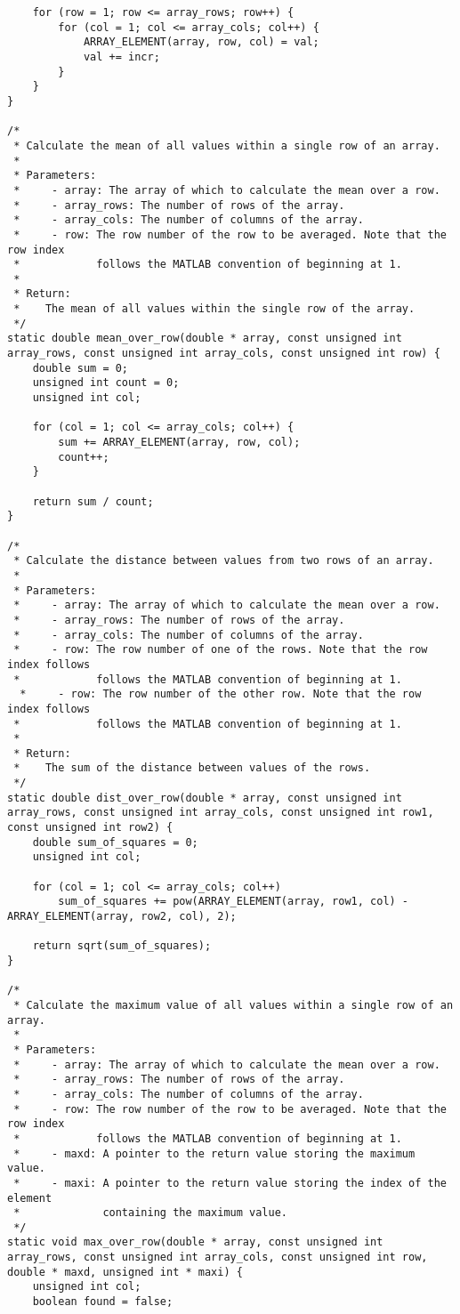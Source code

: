 \begin{lstlisting}
    for (row = 1; row <= array_rows; row++) {
        for (col = 1; col <= array_cols; col++) {
            ARRAY_ELEMENT(array, row, col) = val;
            val += incr;
        }
    }
}

/*
 * Calculate the mean of all values within a single row of an array.
 *
 * Parameters:
 *     - array: The array of which to calculate the mean over a row.
 *     - array_rows: The number of rows of the array.
 *     - array_cols: The number of columns of the array.
 *     - row: The row number of the row to be averaged. Note that the row index 
 *            follows the MATLAB convention of beginning at 1.
 *
 * Return:
 *    The mean of all values within the single row of the array.
 */
static double mean_over_row(double * array, const unsigned int array_rows, const unsigned int array_cols, const unsigned int row) {
    double sum = 0;
    unsigned int count = 0;
    unsigned int col;

    for (col = 1; col <= array_cols; col++) {
        sum += ARRAY_ELEMENT(array, row, col);
        count++;
    }

    return sum / count;
}

/*
 * Calculate the distance between values from two rows of an array.
 *
 * Parameters:
 *     - array: The array of which to calculate the mean over a row.
 *     - array_rows: The number of rows of the array.
 *     - array_cols: The number of columns of the array.
 *     - row: The row number of one of the rows. Note that the row index follows
 *            follows the MATLAB convention of beginning at 1.
  *     - row: The row number of the other row. Note that the row index follows
 *            follows the MATLAB convention of beginning at 1.
 *
 * Return:
 *    The sum of the distance between values of the rows.
 */
static double dist_over_row(double * array, const unsigned int array_rows, const unsigned int array_cols, const unsigned int row1, const unsigned int row2) {
    double sum_of_squares = 0;
    unsigned int col;
    
    for (col = 1; col <= array_cols; col++)
        sum_of_squares += pow(ARRAY_ELEMENT(array, row1, col) - ARRAY_ELEMENT(array, row2, col), 2);
        
    return sqrt(sum_of_squares);
}

/*
 * Calculate the maximum value of all values within a single row of an array.
 *
 * Parameters:
 *     - array: The array of which to calculate the mean over a row.
 *     - array_rows: The number of rows of the array.
 *     - array_cols: The number of columns of the array.
 *     - row: The row number of the row to be averaged. Note that the row index 
 *            follows the MATLAB convention of beginning at 1.
 *     - maxd: A pointer to the return value storing the maximum value.
 *     - maxi: A pointer to the return value storing the index of the element 
 *             containing the maximum value.
 */
static void max_over_row(double * array, const unsigned int array_rows, const unsigned int array_cols, const unsigned int row, double * maxd, unsigned int * maxi) {
    unsigned int col;
	boolean found = false;    


\end{lstlisting}
